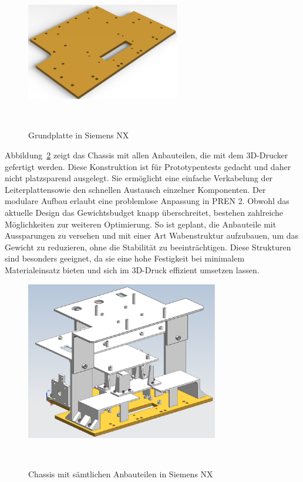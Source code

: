 \documentclass[main.tex]{subfiles} %
\begin{document}
\begin{figure}[H]
    \centering
    \includegraphics[width=0.6\textwidth]{Grundplatte.pdf}
    \caption{Grundplatte in Siemens NX}~\label{fig:Grundplatte}
\end{figure}

Abbildung~\ref{fig:Chassis_komplett} zeigt das Chassis mit allen Anbauteilen,
die mit dem 3D-Drucker gefertigt werden. Diese Konstruktion ist für
Prototypentests gedacht und daher nicht platzsparend ausgelegt. Sie ermöglicht
eine einfache Verkabelung der Leiterplattensowie den schnellen Austausch
einzelner Komponenten. Der modulare Aufbau erlaubt eine problemlose Anpassung
in PREN 2. Obwohl das aktuelle Design das Gewichtsbudget knapp überschreitet,
bestehen zahlreiche Möglichkeiten zur weiteren Optimierung. So ist geplant, die
Anbauteile mit Aussparungen zu versehen und mit einer Art Wabenstruktur
aufzubauen, um das Gewicht zu reduzieren, ohne die Stabilität zu
beeinträchtigen. Diese Strukturen sind besonders geeignet, da sie eine hohe
Festigkeit bei minimalem Materialeinsatz bieten und sich im 3D-Druck effizient
umsetzen lassen.

\begin{figure}[H]
    \centering
    \includegraphics[width=0.75\textwidth]{Chassis_komplett.pdf}
    \caption{Chassis mit sämtlichen Anbauteilen in Siemens NX}~\label{fig:Chassis_komplett}
\end{figure}
\end{document}
